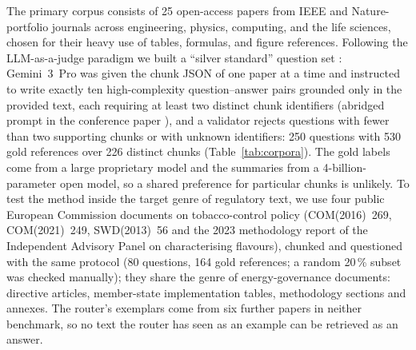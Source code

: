 \documentclass[pdflatex,sn-mathphys-num]{sn-jnl}
\newif\ifprovenance
\newcommand{\verify}[1]{\ifprovenance\textcolor{red}{{\footnotesize [VERIFY: #1]}}\fi}
\theoremstyle{thmstyleone}%
\theoremstyle{thmstylethree}%
\begin{document}
The primary corpus consists of 25 open-access papers from IEEE and Nature-portfolio journals across engineering, physics, computing, and the life sciences, chosen for their heavy use of tables, formulas, and figure references. Following the LLM-as-a-judge paradigm \cite{zheng2023judgingllmasajudgemtbenchchatbot} we built a ``silver standard'' question set \cite{rebholz2010silverstandard}: Gemini~3~Pro was given the chunk JSON of one paper at a time and instructed to write exactly ten high-complexity question--answer pairs grounded only in the provided text, each requiring at least two distinct chunk identifiers (abridged prompt in the conference paper \cite{sandor2025documentslicecontextualretrieval}), and a validator rejects questions with fewer than two supporting chunks or with unknown identifiers: 250 questions with 530 gold references over 226 distinct chunks (Table~\ref{tab:corpora}). The gold labels come from a large proprietary model and the summaries from a 4-billion-parameter open model, so a shared preference for particular chunks is unlikely. To test the method inside the target genre of regulatory text, we use four public European Commission documents on tobacco-control policy (COM(2016)~269, COM(2021)~249, SWD(2013)~56 and the 2023 methodology report of the Independent Advisory Panel on characterising flavours), chunked and questioned with the same protocol (80 questions, 164 gold references; a random 20\,\% subset was checked manually); they share the genre of energy-governance documents: directive articles, member-state implementation tables, methodology sections and annexes. The router's exemplars come from six further papers in neither benchmark, so no text the router has seen as an example can be retrieved as an answer.\verify{\texttt{RnD/split\_documents\_router/}: 6 files, 109 records; \texttt{RnD/input\_router/} holds the PDFs}
\end{document}
